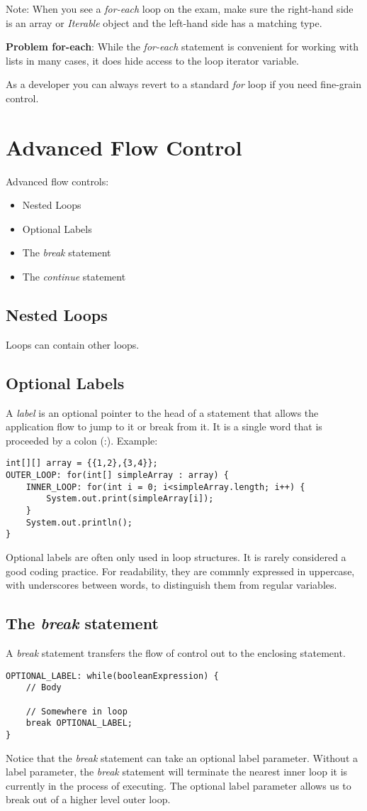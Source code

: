 \documentclass{article}
\begin{document}
Note: When you see a \emph{for-each} loop on the exam, make sure the right-hand side is an array or \emph{Iterable} object and the left-hand side has a matching type.

\textbf{Problem for-each}: While the \emph{for-each} statement is convenient for working with lists in many cases, it does hide access to the loop iterator variable.

As a developer you can always revert to a standard \emph{for} loop if you need fine-grain control.

\section{Advanced Flow Control}
Advanced flow controls:
\begin{itemize}
	\item Nested Loops
	\item Optional Labels
	\item The \emph{break} statement
	\item The \emph{continue} statement
\end{itemize}
\subsection{Nested Loops}
Loops can contain other loops.
\subsection{Optional Labels}
A \emph{label} is an optional pointer to the head of a statement that allows the application flow to jump to it or break from it. It is a single word that is proceeded by a colon (:).
Example:
\begin{lstlisting}
int[][] array = {{1,2},{3,4}};
OUTER_LOOP: for(int[] simpleArray : array) {
	INNER_LOOP: for(int i = 0; i<simpleArray.length; i++) {
		System.out.print(simpleArray[i]);
	}
	System.out.println();
}
\end{lstlisting}
Optional labels are often only used in loop structures. It is rarely considered a good coding practice.
For readability, they are commnly expressed in uppercase, with underscores between words, to distinguish them from regular variables.
\subsection{The \emph{break} statement}
A \emph{break} statement transfers the flow of control out to the enclosing statement.
\begin{lstlisting}
OPTIONAL_LABEL: while(booleanExpression) {
	// Body

	// Somewhere in loop
	break OPTIONAL_LABEL;
}
\end{lstlisting}
Notice that the \emph{break} statement can take an optional label parameter. Without a label parameter, the \emph{break} statement will terminate the nearest inner loop it is currently in the process of executing. The optional label parameter allows us to break out of a higher level outer loop.
\end{document}

